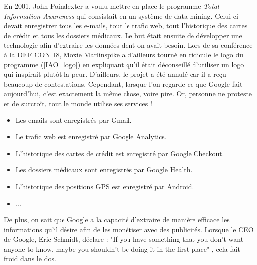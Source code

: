 En 2001, John Poindexter a voulu mettre en place le programme \textit{Total Information Awareness} qui consistait en un système de data mining. Celui-ci devait enregistrer tous les e-mails, tout le trafic web, tout l'historique des cartes de crédit et tous les dossiers médicaux. Le but était ensuite de développer une technologie afin d'extraire les données dont on avait besoin. Lors de sa conférence à la DEF CON 18, Moxie Marlinspike a d'ailleurs tourné en ridicule le logo du programme (\autoref{IAO_logo}) en expliquant qu'il était déconseillé d'utiliser un logo qui inspirait plutôt la peur. D'ailleurs, le projet a été annulé car il a reçu beaucoup de contestations. Cependant, lorsque l'on regarde ce que Google fait aujourd'hui, c'est exactement la même chose, voire pire. Or, personne ne proteste et de surcroît, tout le monde utilise ses services !
\begin{itemize}
  \item Les emails sont enregistrés par Gmail.
  \item Le trafic web est enregistré par Google Analytics.
  \item L'historique des cartes de crédit est enregistré par Google Checkout.
  \item Les dossiers médicaux sont enregistrés par Google Health.
  \item L'historique des positions GPS est enregistré par Android.
  \item ...
\end{itemize}
De plus, on sait que Google a la capacité d'extraire de manière efficace les informations qu'il désire afin de les monétiser avec des publicités. Lorsque le CEO de Google, Eric Schmidt, déclare : "If you have something that you don't want anyone to know, maybe you shouldn't be doing it in the first place" \cite{privacy_eric_schmidt}, cela fait froid dans le dos.

